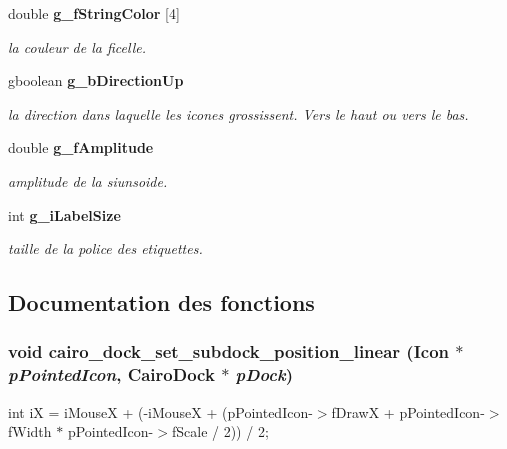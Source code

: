 \begin{CompactItemize}
double {\bf g\_\-f\-String\-Color} [4]
\begin{CompactList}\small\item\em la couleur de la ficelle. \item\end{CompactList}\item 
gboolean {\bf g\_\-b\-Direction\-Up}
\begin{CompactList}\small\item\em la direction dans laquelle les icones grossissent. Vers le haut ou vers le bas. \item\end{CompactList}\item 
double {\bf g\_\-f\-Amplitude}
\begin{CompactList}\small\item\em amplitude de la siunsoide. \item\end{CompactList}\item 
int {\bf g\_\-i\-Label\-Size}
\begin{CompactList}\small\item\em taille de la police des etiquettes. \item\end{CompactList}\end{CompactItemize}


\subsection{Documentation des fonctions}
\subsubsection{\setlength{\rightskip}{0pt plus 5cm}void cairo\_\-dock\_\-set\_\-subdock\_\-position\_\-linear ({\bf Icon} $\ast$ {\em p\-Pointed\-Icon}, {\bf Cairo\-Dock} $\ast$ {\em p\-Dock})}\label{cairo-dock-default-view_8c_09127be8247fe7ae1228c1b7699b0fca}


int i\-X = i\-Mouse\-X + (-i\-Mouse\-X + (p\-Pointed\-Icon-$>$f\-Draw\-X + p\-Pointed\-Icon-$>$f\-Width $\ast$ p\-Pointed\-Icon-$>$f\-Scale / 2)) / 2; 

